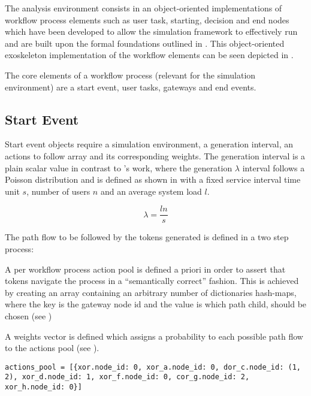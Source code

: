 The analysis environment consists in an object-oriented implementations of workflow process elements such as user task, starting, decision and end nodes which have been developed to allow the simulation framework to effectively run and are built upon the formal foundations outlined in . This object-oriented exoskeleton implementation of the workflow elements can be seen depicted in .


The core elements of a workflow process (relevant for the simulation environment) are a start event, user tasks, gateways and end events.

\subsection{Start Event}

Start event objects require a simulation environment, a generation interval, an actions to follow array and its corresponding weights. The generation interval is a plain scalar value in contrast to \citet{Zeng2005}'s work, where the generation $\lambda$ interval follows a Poisson distribution and is defined as shown in  with a fixed service interval time unit $s$, number of users $n$ and an average system load $l$.

\begin{equation}
\label{eq:generation_interval}
	\lambda = \frac{l n}{s}
\end{equation}

The path flow to be followed by the tokens generated is defined in a two step process:
\begin{enumerate*}
	\item A per workflow process action pool is defined a priori in order to assert that tokens navigate the process in a ``semantically correct'' fashion. This is achieved by creating an array containing an arbitrary number of dictionaries \ie hash-maps, where the key is the gateway node id and the value is which path \ie child, should be chosen (see )
	\item A weights vector is defined which assigns a probability to each possible path flow to the actions pool (see ).
\end{enumerate*}

\begin{lstlisting}[caption=Actions pool,label=lst:actions_pool,style=CustomPython]
    actions_pool = [{xor.node_id: 0, xor_a.node_id: 0, dor_c.node_id: (1, 2), xor_d.node_id: 1, xor_f.node_id: 0, cor_g.node_id: 2, xor_h.node_id: 0}]
\end{lstlisting}

